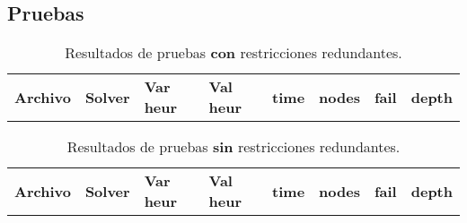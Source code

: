 
\subsection{Pruebas}\label{sec:01-jobshop_mantenimiento-pruebas}

\begin{compactfloats}
\begin{table}[H]
  \centering
  \small
  \setlength{\tabcolsep}{10.8pt}
  \caption{Resultados de pruebas \textbf{con} restricciones redundantes.}
  \label{tab:pruebas-jobshop_mantenimiento-on}
  \begin{tabular}{l l l l l r r r}
    \toprule
    \textbf{Archivo} & \textbf{Solver} & \textbf{Var heur} & \textbf{Val heur} & \textbf{time} & \textbf{nodes} & \textbf{fail} & \textbf{depth} \\
  \end{tabular}
\end{table}

\begin{table}[H]
  \centering
  \small
  \setlength{\tabcolsep}{10.8pt}
  \caption{Resultados de pruebas \textbf{sin} restricciones redundantes.}
  \label{tab:pruebas-jobshop_mantenimiento-off}
  \begin{tabular}{l l l l r r r r}
    \toprule
    \textbf{Archivo} & \textbf{Solver} & \textbf{Var heur} & \textbf{Val heur} & \textbf{time} & \textbf{nodes} & \textbf{fail} & \textbf{depth} \\
  \end{tabular}
\end{table}
\end{compactfloats}

\FloatBarrier
